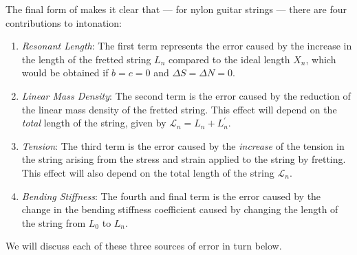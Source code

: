 The final form of  makes it clear that --- for nylon guitar strings --- there are four contributions to intonation:
 \begin{enumerate}
  \item
   \emph{Resonant Length}: The first term represents the error caused by the increase in the length of the fretted string $L_n$ compared to the ideal length $X_n$, which would be obtained if $b = c = 0$ and $\Delta S = \Delta N = 0$.
  \item
   \emph{Linear Mass Density}: The second term is the error caused by the reduction of the linear mass density of the fretted string. This effect will depend on the \emph{total} length of the string, given by $\mathcal{L}_n = L_n + L^\prime_n$.
  \item
   \emph{Tension}: The third term is the error caused by the \emph{increase} of the tension in the string arising from the stress and strain applied to the string by fretting. This effect will also depend on the total length of the string $\mathcal{L}_n$.
  \item
   \emph{Bending Stiffness}: The fourth and final term is the error caused by the change in the bending stiffness coefficient caused by changing the length of the string from $L_0$ to $L_n$.
 \end{enumerate}
We will discuss each of these three sources of error in turn below.


